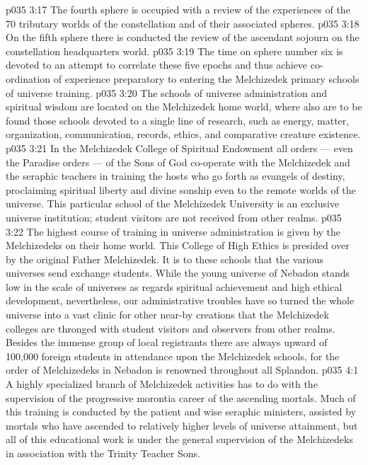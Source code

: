 \vs p035 3:17 \bibnobreakspace The fourth sphere is occupied with a review of the experiences of the 70 tributary worlds of the constellation and of their associated spheres.
\vs p035 3:18 \bibnobreakspace On the fifth sphere there is conducted the review of the ascendant sojourn on the constellation headquarters world.
\vs p035 3:19 \bibnobreakspace The time on sphere number six is devoted to an attempt to correlate these five epochs and thus achieve co\hyp{}ordination of experience preparatory to entering the Melchizedek primary schools of universe training.
\vs p035 3:20 \pc The schools of universe administration and spiritual wisdom are located on the Melchizedek home world, where also are to be found those schools devoted to a single line of research, such as energy, matter, organization, communication, records, ethics, and comparative creature existence.
\vs p035 3:21 In the Melchizedek College of Spiritual Endowment all orders --- even the Paradise orders --- of the Sons of God co\hyp{}operate with the Melchizedek and the seraphic teachers in training the hosts who go forth as evangels of destiny, proclaiming spiritual liberty and divine sonship even to the remote worlds of the universe. This particular school of the Melchizedek University is an exclusive universe institution; student visitors are not received from other realms.
\vs p035 3:22 The highest course of training in universe administration is given by the Melchizedeks on their home world. This College of High Ethics is presided over by the original Father Melchizedek. It is to these schools that the various universes send exchange students. While the young universe of Nebadon stands low in the scale of universes as regards spiritual achievement and high ethical development, nevertheless, our administrative troubles have so turned the whole universe into a vast clinic for other near-by creations that the Melchizedek colleges are thronged with student visitors and observers from other realms. Besides the immense group of local registrants there are always upward of 100,000 foreign students in attendance upon the Melchizedek schools, for the order of Melchizedeks in Nebadon is renowned throughout all Splandon.
\vs p035 4:1 A highly specialized branch of Melchizedek activities has to do with the supervision of the progressive morontia career of the ascending mortals. Much of this training is conducted by the patient and wise seraphic ministers, assisted by mortals who have ascended to relatively higher levels of universe attainment, but all of this educational work is under the general supervision of the Melchizedeks in association with the Trinity Teacher Sons.
